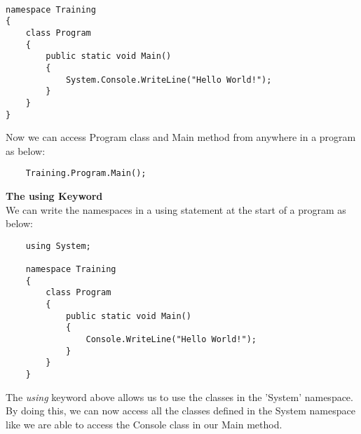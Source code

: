 \begin{lstlisting}

namespace Training
{
    class Program
    {
        public static void Main()
        {
            System.Console.WriteLine("Hello World!");
        }
    }
}
\end{lstlisting}

Now we can access Program class and Main method from anywhere in a program as below:

\begin{lstlisting}
    Training.Program.Main();    
\end{lstlisting}


\textbf{The using Keyword}\\

We can write the namespaces in a using statement at the start of a program as below:

\begin{lstlisting}
    using System;

    namespace Training
    {
        class Program
        {
            public static void Main()
            {
                Console.WriteLine("Hello World!");
            }
        }
    }
\end{lstlisting}

The \emph{using} keyword above allows us to use the classes in the ’System’ namespace. By doing this, we can
now access all the classes defined in the System namespace like we are able to access the Console class in our
Main method.
		
